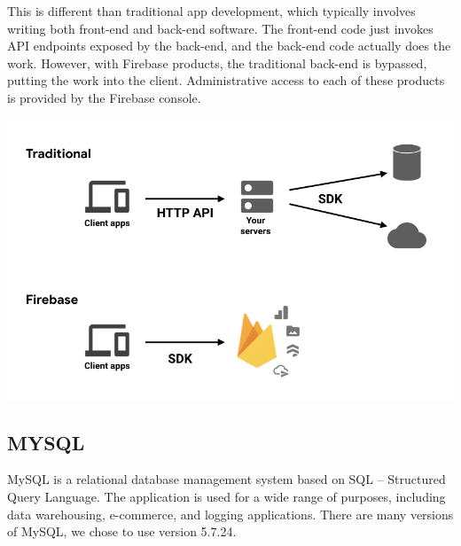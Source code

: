 \documentclass[a4paper,12pt,twoside]{report}
\begin{document}
This is different than traditional app development, which typically involves writing both front-end and back-end software. The front-end code just invokes API endpoints exposed by the back-end, and the back-end code actually does the work. However, with Firebase products, the traditional back-end is bypassed, putting the work into the client. Administrative access to each of these products is provided by the Firebase console.
\begin{center}
\includegraphics[scale=.4]{images/firebaseDiagram.png}
\end{center}

\subsection{MYSQL}
MySQL is a relational database management system based on SQL – Structured Query Language. The application is used for a wide range of purposes, including data warehousing, e-commerce, and logging applications. There are many versions of MySQL, we chose to use version 5.7.24.
\end{document}
